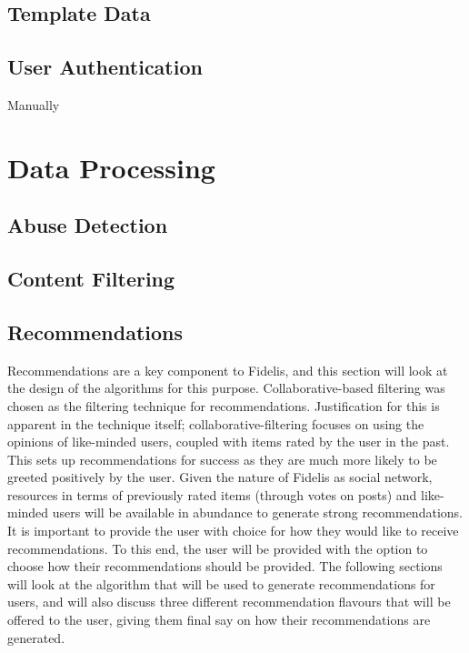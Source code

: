 \subsection{Template Data}


\subsection{User Authentication}
Manually

\section{Data Processing}
\subsection{Abuse Detection}
\subsection{Content Filtering}
\subsection{Recommendations}
Recommendations are a key component to Fidelis, and this section will look at the design of the algorithms for this purpose. Collaborative-based filtering was chosen as the filtering technique for recommendations. Justification for this is apparent in the technique itself; collaborative-filtering focuses on using the opinions of like-minded users, coupled with items rated by the user in the past. This sets up recommendations for success as they are much more likely to be greeted positively by the user. Given the nature of Fidelis as social network, resources in terms of previously rated items (through votes on posts) and like-minded users will be available in abundance to generate strong recommendations. It is important to provide the user with choice for how they would like to receive recommendations. To this end, the user will be provided with the option to choose how their recommendations should be provided. The following sections will look at the algorithm that will be used to generate recommendations for users, and will also discuss three different recommendation flavours that will be offered to the user, giving them final say on how their recommendations are generated. 

